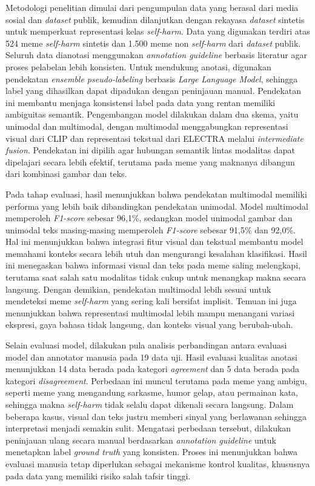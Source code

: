 \begin{center}
	 Metodologi penelitian dimulai dari pengumpulan data yang berasal dari media sosial dan \textit{dataset} publik, kemudian dilanjutkan dengan rekayasa \textit{dataset} sintetis untuk memperkuat representasi kelas \textit{self-harm}. Data yang digunakan terdiri atas 524 meme \textit{self-harm} sintetis dan 1.500 meme non \textit{self-harm} dari \textit{dataset} publik. Seluruh data dianotasi menggunakan \textit{annotation guideline} berbasis literatur agar proses pelabelan lebih konsisten. Untuk mendukung anotasi, digunakan pendekatan \textit{ensemble pseudo-labeling} berbasis \textit{Large Language Model}, sehingga label yang dihasilkan dapat dipadukan dengan peninjauan manual. Pendekatan ini membantu menjaga konsistensi label pada data yang rentan memiliki ambiguitas semantik. Pengembangan model dilakukan dalam dua skema, yaitu unimodal dan multimodal, dengan multimodal menggabungkan representasi visual dari CLIP dan representasi tekstual dari ELECTRA melalui \textit{intermediate fusion}. Pendekatan ini dipilih agar hubungan semantik lintas modalitas dapat dipelajari secara lebih efektif, terutama pada meme yang maknanya dibangun dari kombinasi gambar dan teks.
	 
	 Pada tahap evaluasi, hasil menunjukkan bahwa pendekatan multimodal memiliki performa yang lebih baik dibandingkan pendekatan unimodal. Model multimodal memperoleh \textit{F1-score} sebesar 96,1\%, sedangkan model unimodal gambar dan unimodal teks masing-masing memperoleh \textit{F1-score} sebesar 91,5\% dan 92,0\%. Hal ini menunjukkan bahwa integrasi fitur visual dan tekstual membantu model memahami konteks secara lebih utuh dan mengurangi kesalahan klasifikasi. Hasil ini menegaskan bahwa informasi visual dan teks pada meme saling melengkapi, terutama saat salah satu modalitas tidak cukup untuk menangkap makna secara langsung. Dengan demikian, pendekatan multimodal lebih sesuai untuk mendeteksi meme \textit{self-harm} yang sering kali bersifat implisit. Temuan ini juga menunjukkan bahwa representasi multimodal lebih mampu menangani variasi ekspresi, gaya bahasa tidak langsung, dan konteks visual yang berubah-ubah.

	Selain evaluasi model, dilakukan pula analisis perbandingan antara evaluasi model dan annotator manusia pada 19 data uji. Hasil evaluasi kualitas anotasi menunjukkan 14 data berada pada kategori \textit{agreement} dan 5 data berada pada kategori \textit{disagreement}. Perbedaan ini muncul terutama pada meme yang ambigu, seperti meme yang mengandung sarkasme, humor gelap, atau permainan kata, sehingga makna \textit{self-harm} tidak selalu dapat dikenali secara langsung. Dalam beberapa kasus, visual dan teks justru memberi sinyal yang berlawanan sehingga interpretasi menjadi semakin sulit. Mengatasi perbedaan tersebut, dilakukan peninjauan ulang secara manual berdasarkan \textit{annotation guideline} untuk menetapkan label \textit{ground truth} yang konsisten. Proses ini menunjukkan bahwa evaluasi manusia tetap diperlukan sebagai mekanisme kontrol kualitas, khususnya pada data yang memiliki risiko salah tafsir tinggi.


\end{center}
